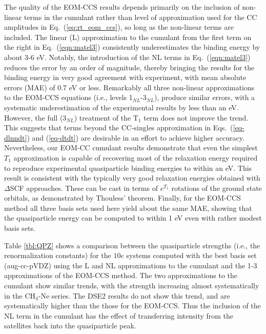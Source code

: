 \documentclass[aps,prb,twocolumn,groupaddress,floatfix]{revtex4}
\begin{document}
The quality of the EOM-CCS results depends primarily on the inclusion of
non-linear terms in the cumulant rather than level of approximation
used for the CC amplitudes in Eq.\ (\ref{eq:rt_eom_ccs}), so long as
the non-linear terms are included.  The linear (L) approximation to
the cumulant from the first term on the right in  Eq.\
(\ref{eqn:matel3}) consistently underestimates the binding energy by about 3-6
eV. Notably, the introduction of the NL terms 
in  Eq.\ (\ref{eqn:matel3}) reduces the error by an order
of magnitude, thereby bringing the results for the binding energy
in very good agreement with experiment, with mean absolute errors
(MAE) of 0.7 eV or less. Remarkably all three non-linear approximations
to the EOM-CCS equations (i.e., levels 1$_{NL}$-3$_{NL}$),
produce similar errors, with a systematic
underestimation of the experimental results by less than an eV.
However, the full (3$_{NL}$) treatment of the
T$_1$ term does not improve the trend. This suggests that 
terms beyond the CC-singles approximation
in Eqs.\ (\ref{eq-dlnndt}) and (\ref{eq-dtdt}) are desirable in an effort
to achieve higher accuracy.
Nevertheless, our EOM-CC cumulant results demonstrate
that even the simplest
$T_1$ approximation is capable of recovering most of the relaxation energy
required to reproduce experimental quasiparticle binding energies to within
an eV. This result is consistent with the typically very good
relaxation energies obtained with $\Delta$SCF
approaches. These can be cast in terms of $e^{T_1}$ rotations of the ground
state orbitals, as demonstrated by Thouless' theorem. Finally, for the EOM-CCS
method all three basis sets used here yield about the same MAE,
showing that the quasiparticle energy can be computed to within 1 eV even
with rather modest basis sets. 

Table \ref{tbl:QPZ} shows a comparison between the quasiparticle
strengths (i.e., the renormalization constants) for
the $10e$ systems computed with the best basis set (aug-cc-pVDZ) using the L and
NL approximations to the cumulant and the 1-3 approximations of the
EOM-CCS method. The two approximations to the cumulant show similar trends, with the strength increasing almost systematically in the CH$_4$-Ne series. The DSE2 results do not show this trend, and are systematically higher than the
those for the EOM-CCS. Thus the inclusion of the NL term in
the cumulant has the effect of transferring intensity from the satellites back into the quasiparticle peak.
\end{document}
